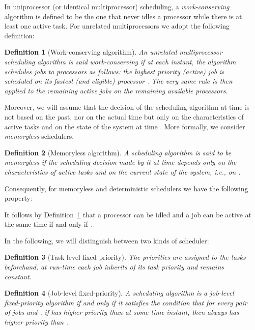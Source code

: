 \documentclass[a4paper,11pt]{article}
\newtheorem{Definition}{Definition}
\begin{document}
In uniprocessor (or identical multiprocessor) scheduling, a {\em
work-conserving} algorithm is defined to be the one that never idles a
processor while there is at least one active task. For unrelated multiprocessors
we adopt the following definition:

\begin{Definition} [Work-conserving algorithm] \label{defWorkC} 
  An unrelated multiprocessor scheduling algorithm is said
\emph{work-conserving} if at each instant, the algorithm schedules jobs
  to processors as follows: the highest priority (active) job  is
  scheduled on its fastest (and eligible) processor . The very
  same rule is then applied to the remaining active jobs on the
  remaining available processors.
\end{Definition}

Moreover, we will assume that the decision of the scheduling
algorithm at time  is not based on the past, nor on the
actual time  but only on the characteristics of active tasks and on
the state of the system at time . More formally, we consider
\emph{memoryless} schedulers.

\begin{Definition}[Memoryless algorithm]\label{def:memoryless} 
  A scheduling algorithm is said to be \emph{memoryless} if the
  scheduling decision made by it at time  depends only on the
  characteristics of active tasks and on the current state of the
  system, i.e., on .
\end{Definition}

Consequently, for memoryless and deterministic schedulers we have the
following property:




It follows by Definition~\ref{defWorkC} that a processor  can
be idled and a job  can be active at the same time if and
only if .

In the following, we will distinguish between two kinds of scheduler:

\begin{Definition}[Task-level fixed-priority]\label{task-level}
The priorities are assigned to the tasks
beforehand, at run-time each job \emph{inherits} of its task
priority and remains constant.
\end{Definition} 

\begin{Definition}[Job-level fixed-priority]\label{prioDr}
  A scheduling algorithm is a {\em job-level fixed-priority}
  algorithm if and only if it satisfies the condition that for every
  pair of jobs  and , if  has higher priority than
   at some time instant, then  always has higher priority
  than .
\end{Definition} 
\end{document}
